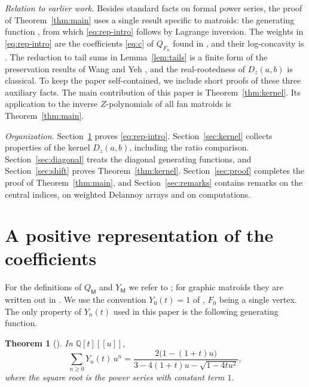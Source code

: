 \documentclass{amsart}
\newtheorem{theorem}{Theorem}[section]
\theoremstyle{definition}
\theoremstyle{remark}
\numberwithin{equation}{section}
\numberwithin{table}{section}
\newcommand{\Dz}{D_z}
\begin{document}
\emph{Relation to earlier work.} Besides standard facts on formal power series, the proof of Theorem~\ref{thm:main} uses a single result specific to matroids: the generating function \cite[Theorem~3.1]{GLL}, from which \eqref{eq:rep-intro} follows by Lagrange inversion. The weights in \eqref{eq:rep-intro} are the coefficients \eqref{eq:c} of $Q_{F_n}$ found in \cite[Theorem~1.1]{GLL}, and their log-concavity is \cite[Theorem~1.2]{GLL}. The reduction to tail sums in Lemma~\ref{lem:tails} is a finite form of the preservation results of Wang and Yeh \cite[Lemmas~2.1 and~2.2, Theorem~2.3]{WY}, and the real-rootedness of $\Dz(a,b)$ is classical. To keep the paper self-contained, we include short proofs of these three auxiliary facts. The main contribution of this paper is Theorem~\ref{thm:kernel}. Its application to the inverse $Z$-polynomials of all fan matroids is Theorem~\ref{thm:main}.

\emph{Organization.} Section~\ref{sec:representation} proves \eqref{eq:rep-intro}. Section~\ref{sec:kernel} collects properties of the kernel $\Dz(a,b)$, including the ratio comparison. Section~\ref{sec:diagonal} treats the diagonal generating functions, and Section~\ref{sec:shift} proves Theorem~\ref{thm:kernel}. Section~\ref{sec:proof} completes the proof of Theorem~\ref{thm:main}, and Section~\ref{sec:remarks} contains remarks on the central indices, on weighted Delannoy arrays and on computations.

\section{A positive representation of the coefficients}\label{sec:representation}

For the definitions of $Q_{\mathsf{M}}$ and $Y_{\mathsf{M}}$ we refer to \cite{GX,FMSV,GRX}; for graphic matroids they are written out in \cite[Section~1]{GLL}. We use the convention $Y_0(t)=1$ of \cite{GLL}, $F_0$ being a single vertex. The only property of $Y_n(t)$ used in this paper is the following generating function.

\begin{theorem}[{\cite[Theorem~3.1]{GLL}}]\label{thm:GLL}
In $\mathbb{Q}[t][[u]]$,
\begin{equation}\label{eq:GLL}
\sum_{n\ge 0}Y_n(t)\,u^n=\frac{2\bigl(1-(1+t)u\bigr)}{3-4(1+t)u-\sqrt{1-4tu^2}},
\end{equation}
where the square root is the power series with constant term $1$.
\end{theorem}
\end{document}
